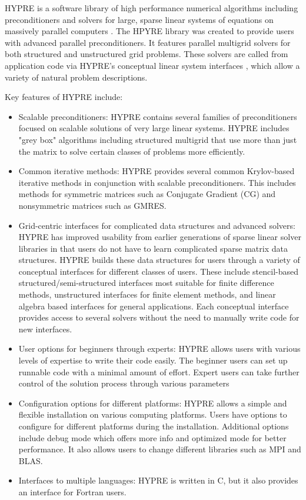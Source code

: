HYPRE is a software library of high performance numerical algorithms including preconditioners and solvers for large, sparse linear systems of equations on massively parallel computers \cite{Falgout2006TheDA}. 
The HPYRE library was created to provide users with advanced parallel preconditioners. It features parallel multigrid solvers for both structured and unstructured grid problems.
These solvers are called from application code via HYPRE's conceptual linear system interfaces \cite{10.5555/1125403.1125423}, which allow a variety of natural problem descriptions.

Key features of HYPRE include:
\begin{itemize}
    \item Scalable preconditioners: HYPRE contains several families of preconditioners focused on scalable solutions of very large linear systems.
    HYPRE includes "grey box" algorithms including structured multigrid that use more than just the matrix to solve certain classes of problems more efficiently.
    \item Common iterative methods: HYPRE provides several common Krylov-based iterative methods in conjunction with scalable preconditioners. 
    This includes methods for symmetric matrices such as Conjugate Gradient (CG) and nonsymmetric matrices such as GMRES.
    \item Grid-centric interfaces for complicated data structures and advanced solvers: HYPRE has improved usability from earlier generations of sparse linear solver libraries in that users do not have to learn complicated sparse matrix data structures.
    HYPRE builds these data structures for users through a variety of conceptual interfaces for different classes of users.
    These include stencil-based structured/semi-structured interfaces most suitable for finite difference methods, unstructured interfaces for finite element methods, and linear algebra based interfaces for general applications.
    Each conceptual interface provides access to several solvers without the need to manually write code for new interfaces.
    \item User options for beginners through experts: HYPRE allows users with various levels of expertise to write their code easily. The beginner users can set up runnable code with a minimal amount of effort. Expert users can take further control of the solution process through various parameters
    \item Configuration options for different platforms: HYPRE allows a simple and flexible installation on various computing platforms. Users have options to configure for different platforms during the installation.
    Additional options include debug mode which offers more info and optimized mode for better performance.
    It also allows users to change different libraries such as MPI and BLAS.
    \item Interfaces to multiple languages: HYPRE is written in C, but it also provides an interface for Fortran users.
\end{itemize}